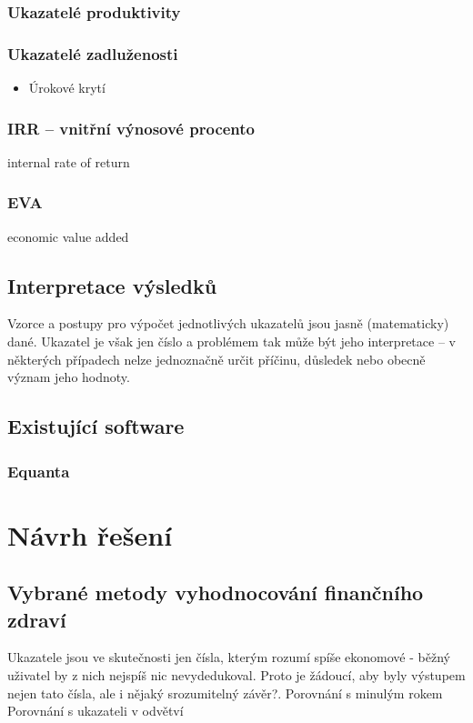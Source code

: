 \subsection{Ukazatelé produktivity}

\subsection{Ukazatelé zadluženosti}
\begin{itemize}
\item{Úrokové krytí}
\end{itemize}


\subsection{IRR -- vnitřní výnosové procento}
internal rate of return

\subsection{EVA}
economic value added



\section{Interpretace výsledků}
Vzorce a postupy pro výpočet jednotlivých ukazatelů jsou jasně (matematicky) dané. Ukazatel je však jen číslo a problémem tak může být jeho interpretace -- v některých případech nelze jednoznačně určit příčinu, důsledek nebo obecně význam jeho hodnoty. 

\section{Existující software}
\subsection{Equanta\sffamily\textregistered}

\chapter{Návrh řešení}
\section{Vybrané metody vyhodnocování finančního zdraví}
Ukazatele jsou ve skutečnosti jen čísla, kterým rozumí spíše ekonomové - běžný uživatel by z nich nejspíš nic nevydedukoval. Proto je žádoucí, aby byly výstupem nejen tato čísla, ale i nějaký srozumitelný závěr?.
Porovnání s minulým rokem
Porovnání s ukazateli v odvětví

